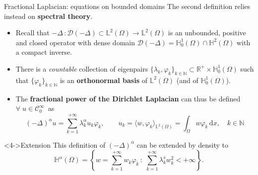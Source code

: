 \documentclass[aspectratio=169,xcolor=dvipsnames]{beamer}
\begin{document}
	\begin{frame}{Fractional Laplacian: equations on bounded domains}
	The second definition relies instead on \textbf{spectral theory}. 
	
	\begin{itemize}
		\item[\faCog]<1-> Recall that $-\Delta \,:\mathcal{D}(-\Delta) \subset \mathbb{L}^2(\Omega) \rightarrow \mathbb{L}^2(\Omega)$ is an unbounded, positive and closed operator with dense domain $\mathcal{D}(-\Delta) = \mathbb{H}_0^1(\Omega) \cap \mathbb{H}^2(\Omega)$ with a compact inverse.
		\item[\faBook]<2-> There is a \emph{countable} collection of eigenpairs $\{\lambda_k,\varphi_k\}_{k \in \mathbb{N}} \subset \mathbb{R}^+ \times \mathbb{H}_0^{1}(\Omega)$ such that $\{\varphi_k\}_{k \in \mathbb{N}}$ is an \textbf{orthonormal basis} of $\mathbb{L}^2(\Omega)$ (and of $\mathbb{H}_0^{1}(\Omega)$).
		\item[\faWrench]<3-> The \alert{\textbf{fractional power of the Dirichlet Laplacian}} can thus be defined $\forall\;u \in \mathcal{C}^{\infty}_0$~as 
		\[
		(-\Delta)^\alpha u = \sum_{k=1}^{+\infty} \lambda_k^\alpha u_k \varphi_k, \qquad u_k = \langle w , \varphi_k \rangle_{\mathbb{L}^2(\Omega)} = \int_{\Omega} w \varphi_k \,\mathrm{d}x, \quad k \in \mathbb{N}
		\]
	\end{itemize}\vspace{-1em}
	
	\begin{block}<4->{Extension}
	This definition of $(-\Delta)^\alpha$ can be extended by density to\vspace{-1em}
	\[
	\mathbb{H}^\alpha(\Omega) = \left\lbrace w = \sum_{k=1}^{+\infty} w_k \varphi_k\,:\;\sum_{k=1}^{+\infty} \lambda_k^s w_k^2 < +\infty \right\rbrace.
	\]
	\end{block}
	
	\end{frame}
\end{document}
